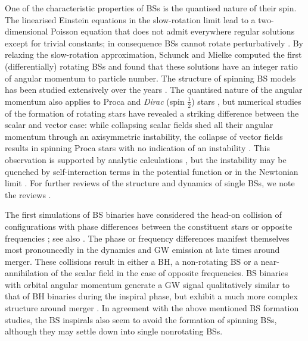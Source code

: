 \documentclass[]{iopart}
\begin{document}
One of the characteristic properties of BSs is the quantised nature
of their spin. The linearised Einstein equations in the slow-rotation
limit lead to a two-dimensional Poisson equation that does not admit
everywhere regular solutions except for trivial constants; in
consequence BSs cannot rotate perturbatively \cite{Kobayashi:1994qi}.
By relaxing the slow-rotation approximation, Schunck and Mielke
\cite{Schunck:1996he} computed the first (differentially) rotating
BSs and found that these solutions have an integer ratio of angular
momentum to particle number. The structure of spinning BS models
has been studied extensively over the years
\cite{Ryan:1996nk,Yoshida:1997jq,Yoshida:1997qf,Yoshida:1997nd,Schunck:1999pm,Kleihaus:2005me,Kleihaus:2007vk,Kleihaus:2011sx,Collodel:2017biu}.
The quantised nature of the angular momentum also applies to Proca
and {\it Dirac} (spin $\tfrac{1}{2}$) stars \cite{Herdeiro:2019mbz},
but numerical studies of the formation of rotating stars have
revealed a striking difference between the scalar and vector case:
while collapsing scalar fields shed all their angular momentum
through an axisymmetric instability, the collapse of vector fields
results in spinning Proca stars with no indication of an instability
\cite{Sanchis-Gual:2019ljs,DiGiovanni:2020ror}.  This observation
is supported by analytic calculations \cite{Dmitriev:2021utv}, but
the instability may be quenched by self-interaction terms in the
potential function or in the Newtonian limit \cite{Siemonsen:2020hcg}.
For further reviews of the structure and dynamics of single BSs,
we note the reviews
\cite{Mielke:1997re,Mielke:2000mh,Mundim:2010hi,Liebling:2012fv}. 

The first simulations of BS binaries have considered the head-on
collision of configurations with phase differences between the
constituent stars or opposite frequencies \cite{Palenzuela:2006wp};
see also \cite{Choptuik:2009ww,Bezares:2017mzk}.  The phase or
frequency differences manifest themselves most pronouncedly in the
dynamics and GW emission at late times around merger. These collisions
result in either a BH, a non-rotating BS or a near-annihilation of
the scalar field in the case of opposite frequencies. BS binaries
with orbital angular momentum generate a GW signal qualitatively
similar to that of BH binaries during the inspiral phase, but exhibit
a much more complex structure around merger
\cite{Palenzuela:2007dm,Palenzuela:2017kcg}.  In agreement with the
above mentioned BS formation studies, the BS inspirals also seem
to avoid the formation of spinning BSs, although they may settle
down into single nonrotating BSs.
\end{document}
